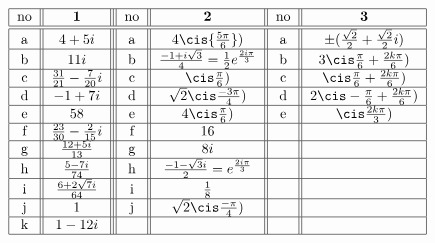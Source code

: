 \[ \begin{tabular}{| c || c || | c | | c | | c | | c | c | }
\hline  no &         ${\bf 1}                                                         $    & no     &        ${\bf 2}  $                           	         & no         &      ${\bf 3}  $            \\    \hline \hline
           a   &      $4+5i                      $  				            & a  &   $4\cis{\frac{5\pi}{6}})$     		                  &a&  $\pm(\frac{\sqrt 2}{2}+ \frac{\sqrt 2}{2}i)$  \\ \hline 
           b  &      $11i                                        $   			   & b  &  $\frac{-1+i\sqrt 3}{4}=\frac{ 1 }{2} e^{\frac{ 2i\pi }{ 3 }}      $          		          &b & $3\cis \frac{\pi}{6}+\frac{2k\pi}{6})$ \\ \hline
           c   &      $\frac{31}{21}-\frac{7}{20}i                      $   		   & c  & $\cis\frac{\pi}{6})	 $   				   &c&  $\cis \frac{\pi}{6}+\frac{2k\pi}{6})$  \\ \hline 
           d   &      $-1+7i                                  $   			   & d &   $\sqrt 2\cis\frac{-3\pi}{4})$ 			        &d&  $ 2\cis -\frac{\pi}{6}+\frac{2k\pi}{6}) $\\ \hline 
           e   &      $58          $   						   & e &  $4   	\cis\frac{\pi}{6})	 $			&e& $\cis \frac{2k\pi}{3})$ \\ \hline
           f   &      $\frac{23}{30}-\frac{2}{15}i   $    			            & f  & $16      $       		 
& &  \\ \hline
           g   &      $\frac{12+5i}{13}   			 $   			   & g  & $8i$                  					 & &  \\ \hline
           h   &    $\frac{5-7i}{74}  			 $ 			    	   & h  & $\frac{-1-\sqrt3 i}{2}= e^{\frac{ 2i\pi }{ 3 }}$                                         & & \\ \hline
           i    &      $      	\frac{6+2\sqrt 7 i}{64}         $  			   & i  & $ \frac{1}{8}$                &          &                           \\  \hline
           j    &      $      	1				         $    		  & j  & $ \sqrt 2 \cis \frac{-\pi}{4} )$                &          &                           \\  \hline
          k   &      $      	1-12i				         $    		  &  &                 &          &                           \\  \hline           
\end{tabular} \]


